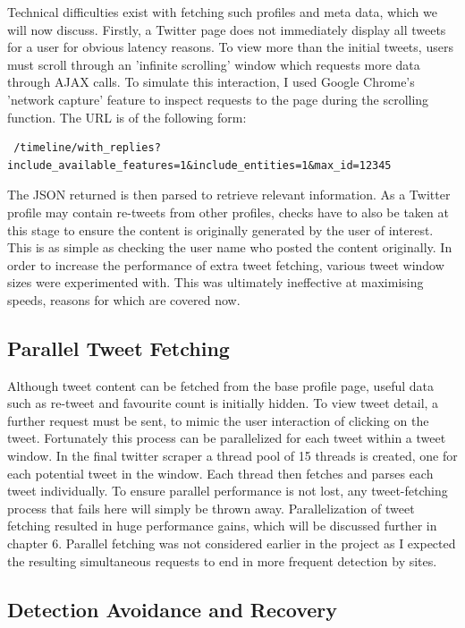 Technical difficulties exist with fetching such profiles and meta data, which we will now discuss. Firstly, a Twitter page does not immediately display all tweets for a user for obvious latency reasons. To view more than the initial tweets, users must scroll through an 'infinite scrolling' window which requests more data through AJAX calls. To simulate this interaction, I used Google Chrome's 'network capture' feature to inspect requests to the page during the scrolling function. The URL is of the following form:

\begin{verbatim}
 /timeline/with_replies?include_available_features=1&include_entities=1&max_id=12345
\end{verbatim}

\noindent The JSON returned is then parsed to retrieve relevant information. As a Twitter profile may contain re-tweets from other profiles, checks have to also be taken at this stage to ensure the content is originally generated by the user of interest. This is as simple as checking the user name who posted the content originally. In order to increase the performance of extra tweet fetching, various tweet window sizes were experimented with. This was ultimately ineffective at maximising speeds, reasons for which are covered now.

\subsection{Parallel Tweet Fetching}

Although tweet content can be fetched from the base profile page, useful data such as re-tweet and favourite count is initially hidden. To view tweet detail, a further request must be sent, to mimic the user interaction of clicking on the tweet. Fortunately this process can be parallelized for each tweet within a tweet window. In the final twitter scraper a thread pool of 15 threads is created, one for each potential tweet in the window. Each thread then fetches and parses each tweet individually. To ensure parallel performance is not lost, any tweet-fetching process that fails here will simply be thrown away. Parallelization of tweet fetching resulted in huge performance gains, which will be discussed further in chapter 6. Parallel fetching was not considered earlier in the project as I expected the resulting simultaneous requests to end in more frequent detection by sites. 

\subsection{Detection Avoidance and Recovery}

